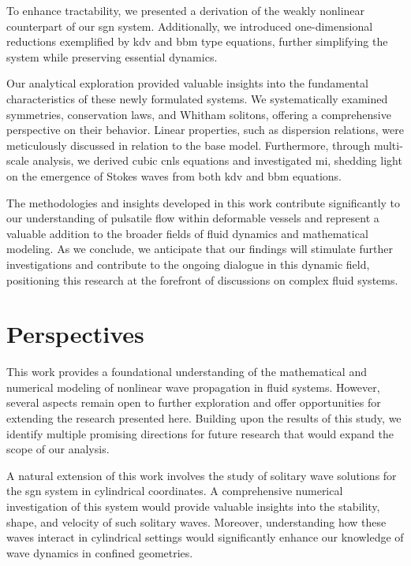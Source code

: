 \documentclass[alpha-refs, 12pt]{wiley-article}
\begin{document}
To enhance tractability, we presented a derivation of the weakly nonlinear counterpart of our \acrshort{sgn} system. Additionally, we introduced one-dimensional reductions exemplified by \acrfull{kdv} and \acrfull{bbm} type equations, further simplifying the system while preserving essential dynamics.

Our analytical exploration provided valuable insights into the fundamental characteristics of these newly formulated systems. We systematically examined symmetries, conservation laws, and Whitham solitons, offering a comprehensive perspective on their behavior. Linear properties, such as dispersion relations, were meticulously discussed in relation to the base model. Furthermore, through multi-scale analysis, we derived cubic \acrfull{cnls} equations and investigated \acrshort{mi}, shedding light on the emergence of Stokes waves from both \acrshort{kdv} and \acrshort{bbm} equations.

The methodologies and insights developed in this work contribute significantly to our understanding of pulsatile flow within deformable vessels and represent a valuable addition to the broader fields of fluid dynamics and mathematical modeling. As we conclude, we anticipate that our findings will stimulate further investigations and contribute to the ongoing dialogue in this dynamic field, positioning this research at the forefront of discussions on complex fluid systems.

\section{Perspectives}\label{sec:perspectives}

This work provides a foundational understanding of the mathematical and numerical modeling of nonlinear wave propagation in fluid systems. However, several aspects remain open to further exploration and offer opportunities for extending the research presented here. Building upon the results of this study, we identify multiple promising directions for future research that would expand the scope of our analysis.

A natural extension of this work involves the study of solitary wave solutions for the \acrfull{sgn} system in cylindrical coordinates. A comprehensive numerical investigation of this system would provide valuable insights into the stability, shape, and velocity of such solitary waves. Moreover, understanding how these waves interact in cylindrical settings would significantly enhance our knowledge of wave dynamics in confined geometries.
\end{document}
